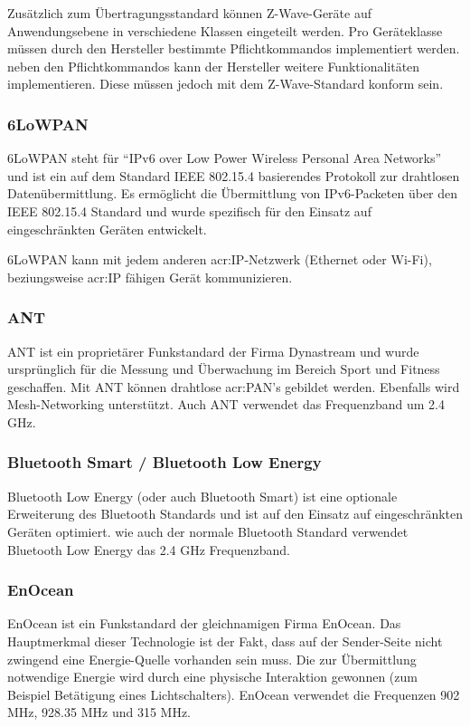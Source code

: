 Zusätzlich zum Übertragungsstandard können Z-Wave-Geräte auf Anwendungsebene in verschiedene Klassen eingeteilt werden. Pro Geräteklasse müssen durch den Hersteller bestimmte Pflichtkommandos implementiert werden. neben den Pflichtkommandos kann der Hersteller weitere Funktionalitäten implementieren. Diese müssen jedoch mit dem Z-Wave-Standard konform sein.

\subsubsection{6LoWPAN}
6LoWPAN steht für "`IPv6 over Low Power Wireless Personal Area Networks"' und ist ein auf dem Standard IEEE 802.15.4 basierendes Protokoll zur drahtlosen Datenübermittlung. Es ermöglicht die Übermittlung von IPv6-Packeten über den IEEE 802.15.4 Standard und wurde spezifisch für den Einsatz auf eingeschränkten Geräten entwickelt. 

6LoWPAN kann mit jedem anderen \gls{acr:IP}-Netzwerk (Ethernet oder Wi-Fi), beziungsweise \gls{acr:IP} fähigen Gerät kommunizieren. 

\subsubsection{ANT}
ANT ist ein proprietärer Funkstandard der Firma Dynastream und wurde ursprünglich für die Messung und Überwachung im Bereich Sport und Fitness geschaffen. Mit ANT können drahtlose \gls{acr:PAN}'s gebildet werden. Ebenfalls wird Mesh-Networking unterstützt. Auch ANT verwendet das Frequenzband um 2.4 GHz.


\subsubsection{Bluetooth Smart / Bluetooth Low Energy}
Bluetooth Low Energy (oder auch Bluetooth Smart) ist eine optionale Erweiterung des Bluetooth Standards und ist auf den Einsatz auf eingeschränkten Geräten optimiert. wie auch der normale Bluetooth Standard verwendet Bluetooth Low Energy das 2.4 GHz Frequenzband.


\subsubsection{EnOcean}
EnOcean ist ein Funkstandard der gleichnamigen Firma EnOcean. Das Hauptmerkmal dieser Technologie ist der Fakt, dass auf der Sender-Seite nicht zwingend eine Energie-Quelle vorhanden sein muss. Die zur Übermittlung notwendige Energie wird durch eine physische Interaktion gewonnen (zum Beispiel Betätigung eines Lichtschalters). EnOcean verwendet die Frequenzen 902 MHz, 928.35 MHz und 315 MHz.


